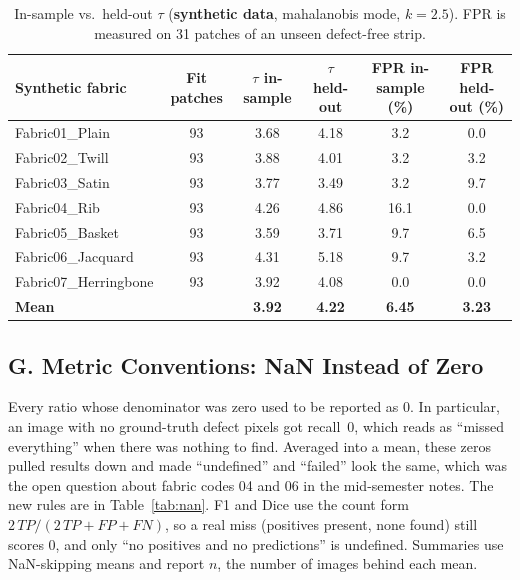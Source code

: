 \documentclass[11pt,a4paper]{article}
\begin{document}
\begin{table}[h]
\centering
\caption{In-sample vs.\ held-out $\tau$ (\textbf{synthetic data}, mahalanobis mode, $k=2.5$). FPR is measured on 31 patches of an unseen defect-free strip.}
\label{tab:tau}
\small
\begin{tabularx}{\textwidth}{@{}lCCCCC@{}}
\toprule
\textbf{Synthetic fabric} & \textbf{Fit patches} & \textbf{$\tau$ in-sample} & \textbf{$\tau$ held-out} & \textbf{FPR in-sample (\%)} & \textbf{FPR held-out (\%)} \\
\midrule
Fabric01\_Plain & 93 & 3.68 & 4.18 & 3.2 & 0.0 \\
Fabric02\_Twill & 93 & 3.88 & 4.01 & 3.2 & 3.2 \\
Fabric03\_Satin & 93 & 3.77 & 3.49 & 3.2 & 9.7 \\
Fabric04\_Rib & 93 & 4.26 & 4.86 & 16.1 & 0.0 \\
Fabric05\_Basket & 93 & 3.59 & 3.71 & 9.7 & 6.5 \\
Fabric06\_Jacquard & 93 & 4.31 & 5.18 & 9.7 & 3.2 \\
Fabric07\_Herringbone & 93 & 3.92 & 4.08 & 0.0 & 0.0 \\
\midrule
\textbf{Mean} & & \textbf{3.92} & \textbf{4.22} & \textbf{6.45} & \textbf{3.23} \\
\bottomrule
\end{tabularx}
\end{table}

\subsection*{G. Metric Conventions: NaN Instead of Zero}

Every ratio whose denominator was zero used to be reported as 0. In particular, an image with no ground-truth defect pixels got recall~$0$, which reads as ``missed everything'' when there was nothing to find. Averaged into a mean, these zeros pulled results down and made ``undefined'' and ``failed'' look the same, which was the open question about fabric codes 04 and 06 in the mid-semester notes. The new rules are in Table~\ref{tab:nan}. F1 and Dice use the count form $2\,TP/(2\,TP+FP+FN)$, so a real miss (positives present, none found) still scores 0, and only ``no positives and no predictions'' is undefined. Summaries use NaN-skipping means and report $n$, the number of images behind each mean.
\end{document}
